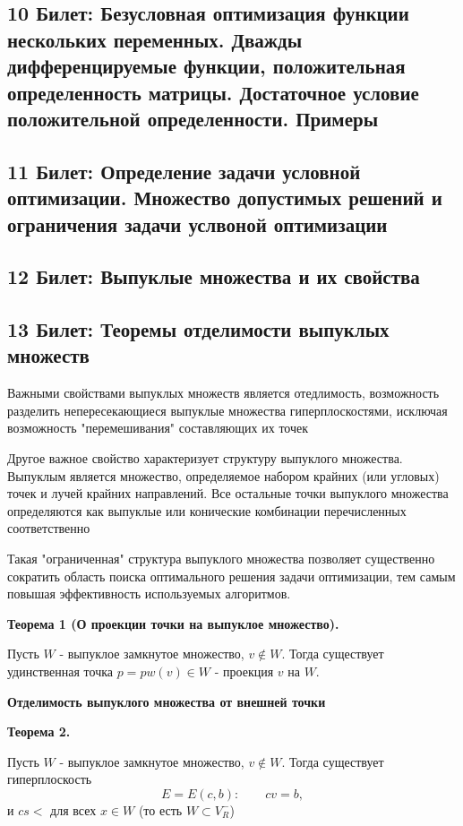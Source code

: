 \documentclass[14pt, letterpaper]{article}
\begin{document}
\newpage
\subsection{10 Билет: Безусловная оптимизация функции нескольких переменных. Дважды дифференцируемые функции, 
положительная определенность матрицы. Достаточное условие положительной определенности. Примеры}

\newpage
\subsection{11 Билет: Определение задачи условной оптимизации. Множество допустимых решений и ограничения задачи 
услвоной оптимизации}

\newpage
\subsection{12 Билет: Выпуклые множества и их свойства}

\newpage
\subsection{13 Билет: Теоремы отделимости выпуклых множеств}

Важными свойствами выпуклых множеств является отедлимость, возможность разделить непересекающиеся выпуклые множества гиперплоскостями, исключая возможность "перемешивания" составляющих их точек

Другое важное свойство характеризует структуру выпуклого множества. Выпуклым является множество, определяемое набором крайних (или угловых) точек и лучей крайних направлений. Все остальные точки выпуклого множества определяются как выпуклые или конические комбинации перечисленных соответственно

Такая "ограниченная" структура выпуклого множества позволяет существенно сократить область поиска оптимального решения задачи оптимизации, тем самым повышая эффективность используемых алгоритмов.

\textbf{Теорема 1 (О проекции точки на выпуклое множество).}

Пусть $W$ - выпуклое замкнутое множество, $v \notin W$. Тогда существует удинственная точка $p = pw(v) \in W$ - проекция $v$ на $W$.

\textbf{Отделимость выпуклого множества от внешней точки}


\textbf{Теорема 2.}

Пусть $W$ - выпуклое замкнутое множество, $v \notin W$. Тогда существует гиперплоскость
    $$ E = E(c, b): \qquad  cv = b,$$
и $cs \lt$ для всех $x \in W$ (то есть $W \subset V^{-}_{R}$)
\end{document}
